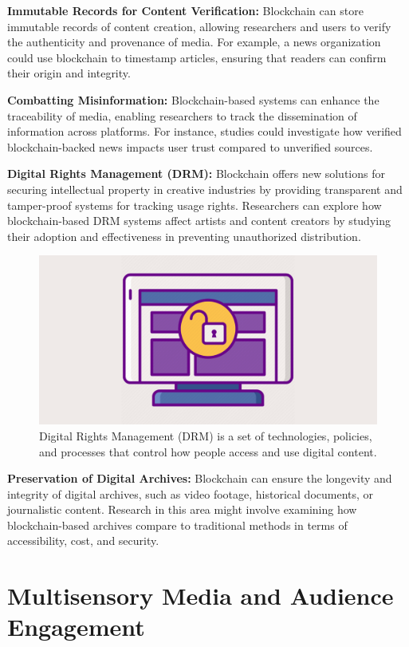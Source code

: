 \documentclass[
]{book}
\begin{document}
\textbf{Immutable Records for Content Verification:} Blockchain can store immutable records of content creation, allowing researchers and users to verify the authenticity and provenance of media. For example, a news organization could use blockchain to timestamp articles, ensuring that readers can confirm their origin and integrity.

\textbf{Combatting Misinformation:} Blockchain-based systems can enhance the traceability of media, enabling researchers to track the dissemination of information across platforms. For instance, studies could investigate how verified blockchain-backed news impacts user trust compared to unverified sources.

\textbf{Digital Rights Management (DRM):} Blockchain offers new solutions for securing intellectual property in creative industries by providing transparent and tamper-proof systems for tracking usage rights. Researchers can explore how blockchain-based DRM systems affect artists and content creators by studying their adoption and effectiveness in preventing unauthorized distribution.

\begin{figure}
\centering
\includegraphics[width=1\linewidth,height=\textheight,keepaspectratio]{images/drm.png}
\caption{Digital Rights Management (DRM) is a set of technologies, policies, and processes that control how people access and use digital content.}
\end{figure}

\textbf{Preservation of Digital Archives:} Blockchain can ensure the longevity and integrity of digital archives, such as video footage, historical documents, or journalistic content. Research in this area might involve examining how blockchain-based archives compare to traditional methods in terms of accessibility, cost, and security.

\section{Multisensory Media and Audience Engagement}\label{multisensory-media-and-audience-engagement}
\end{document}
